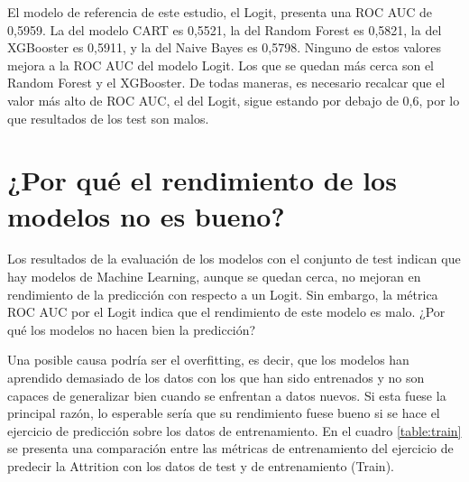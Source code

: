 El modelo de referencia de este estudio, el Logit, presenta una ROC AUC de 0,5959. La del modelo CART es 0,5521, la del Random Forest es 0,5821, la del XGBooster es 0,5911, y la del Naive Bayes es 0,5798. Ninguno de estos valores mejora a la ROC AUC del modelo Logit. Los que se quedan más cerca son el Random Forest y el XGBooster. De todas maneras, es necesario recalcar que el valor más alto de ROC AUC, el del Logit, sigue estando por debajo de 0,6, por lo que resultados de los test son malos.

\section{¿Por qué el rendimiento de los modelos no es bueno?}

Los resultados de la evaluación de los modelos con el conjunto de test indican que hay modelos de Machine Learning, aunque se quedan cerca, no mejoran en rendimiento de la predicción con respecto a un Logit. Sin embargo, la métrica ROC AUC por el Logit indica que el rendimiento de este modelo es malo. ¿Por qué los modelos no hacen bien la predicción?

Una posible causa podría ser el overfitting, es decir, que los modelos han aprendido demasiado de los datos con los que han sido entrenados y no son capaces de generalizar bien cuando se enfrentan a datos nuevos. Si esta fuese la principal razón, lo esperable sería que su rendimiento fuese bueno si se hace el ejercicio de predicción sobre los datos de entrenamiento. En el cuadro \ref{table:train} se presenta una comparación entre las métricas de entrenamiento del ejercicio de predecir la Attrition con los datos de test y de entrenamiento (Train).

